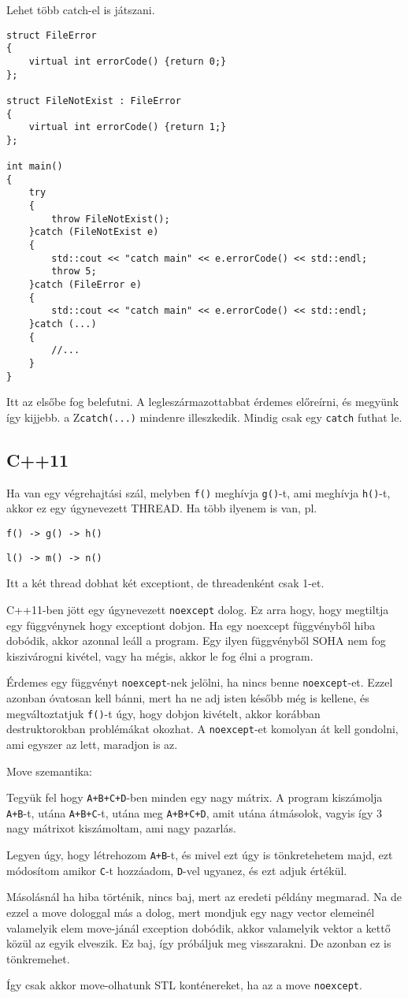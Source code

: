 \documentclass[a4paper,11.5pt]{article}
\begin{document}
		Lehet több catch-el is játszani.
		\begin{lstlisting}
struct FileError
{
	virtual int errorCode() {return 0;}
};

struct FileNotExist : FileError
{
	virtual int errorCode() {return 1;}
};

int main()
{
	try
	{
		throw FileNotExist();
	}catch (FileNotExist e)
	{
		std::cout << "catch main" << e.errorCode() << std::endl;
		throw 5;
	}catch (FileError e)
	{
		std::cout << "catch main" << e.errorCode() << std::endl;
	}catch (...)
	{
		//...	
	}
}
		\end{lstlisting}
		Itt az elsőbe fog belefutni. A legleszármazottabbat érdemes előreírni, és megyünk így kijjebb. a Z\texttt{catch(...)} mindenre illeszkedik. Mindig csak egy \texttt{catch} futhat le.
		\bigskip
		
		\subsection{C++11}
		
		Ha van egy végrehajtási szál, melyben \texttt{f()} meghívja \texttt{g()}-t, ami meghívja \texttt{h()}-t, akkor ez egy úgynevezett THREAD. Ha több ilyenem is van, pl.
		
		\texttt{f() -> g() -> h()}
		
		\texttt{l() -> m() -> n()}
		
		Itt a két thread dobhat két exceptiont, de threadenként csak 1-et.
		
		\medskip
		C++11-ben jött egy úgynevezett \texttt{noexcept} dolog. Ez arra hogy, hogy megtiltja egy függvénynek hogy exceptiont dobjon. Ha egy noexcept függvényből hiba dobódik, akkor azonnal leáll a program. Egy ilyen függvényből SOHA nem fog kiszivárogni kivétel, vagy ha mégis, akkor le fog élni a program.
		
		Érdemes egy függvényt \texttt{noexcept}-nek jelölni, ha nincs benne \texttt{noexcept}-et. Ezzel azonban óvatosan kell bánni, mert ha ne adj isten később még is kellene, és megváltoztatjuk \texttt{f()}-t úgy, hogy dobjon kivételt, akkor korábban destruktorokban problémákat okozhat. A \texttt{noexcept}-et komolyan át kell gondolni, ami egyszer az lett, maradjon is az.
		\medskip
		
		Move szemantika:
		
		Tegyük fel hogy \texttt{A+B+C+D}-ben minden egy nagy mátrix. A program kiszámolja \texttt{A+B}-t, utána \texttt{A+B+C}-t, utána meg \texttt{A+B+C+D}, amit utána átmásolok, vagyis így 3 nagy mátrixot kiszámoltam, ami nagy pazarlás.
		
		Legyen úgy, hogy létrehozom \texttt{A+B}-t, és mivel ezt úgy is tönkretehetem majd, ezt módosítom amikor \texttt{C}-t hozzáadom, \texttt{D}-vel ugyanez, és ezt adjuk értékül.
		
		Másolásnál ha hiba történik, nincs baj, mert az eredeti példány megmarad. Na de ezzel a move dologgal más a dolog, mert mondjuk egy nagy vector elemeinél valamelyik elem move-jánál exception dobódik, akkor valamelyik vektor a kettő közül az egyik elveszik. Ez baj, így próbáljuk meg visszarakni. De azonban ez is tönkremehet. 
		
		Így csak akkor move-olhatunk STL konténereket, ha az a move \texttt{noexcept}.
		
		
\end{document}
